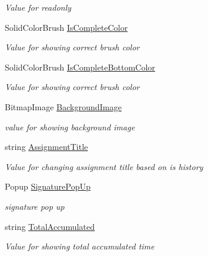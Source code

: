 \begin{DoxyCompactItemize}
\begin{DoxyCompactList}\small\item\em Value for readonly \end{DoxyCompactList}\item 
Solid\+Color\+Brush \hyperlink{class_field_service_1_1_win_r_t_1_1_view_models_1_1_assignment_view_model_a2fdeadf4c5c6aefd4cf6c52e9e0822c0}{Is\+Complete\+Color}
\begin{DoxyCompactList}\small\item\em Value for showing correct brush color \end{DoxyCompactList}\item 
Solid\+Color\+Brush \hyperlink{class_field_service_1_1_win_r_t_1_1_view_models_1_1_assignment_view_model_ad08a7f339e1fe5519a7166ff447abced}{Is\+Complete\+Bottom\+Color}
\begin{DoxyCompactList}\small\item\em Value for showing correct brush color \end{DoxyCompactList}\item 
Bitmap\+Image \hyperlink{class_field_service_1_1_win_r_t_1_1_view_models_1_1_assignment_view_model_a0ee1edfba6b444be847045d97f326fe0}{Background\+Image}
\begin{DoxyCompactList}\small\item\em value for showing background image \end{DoxyCompactList}\item 
string \hyperlink{class_field_service_1_1_win_r_t_1_1_view_models_1_1_assignment_view_model_a7862317901c735101d607d586fc4d3b6}{Assignment\+Title}
\begin{DoxyCompactList}\small\item\em Value for changing assignment title based on is history \end{DoxyCompactList}\item 
Popup \hyperlink{class_field_service_1_1_win_r_t_1_1_view_models_1_1_assignment_view_model_abba4776d131b7cf0ed4e3ca68c53dc39}{Signature\+Pop\+Up}
\begin{DoxyCompactList}\small\item\em signature pop up \end{DoxyCompactList}\item 
string \hyperlink{class_field_service_1_1_win_r_t_1_1_view_models_1_1_assignment_view_model_a5a5efa41539e88f76bf560fe6c42d44b}{Total\+Accumulated}
\begin{DoxyCompactList}\small\item\em Value for showing total accumulated time \end{DoxyCompactList}\end{DoxyCompactItemize}
